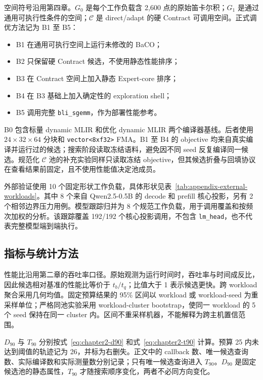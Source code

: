 空间符号沿用第四章。$G_0$ 是每个工作负载含 2,600 点的原始笛卡尔积；$G_1$ 是通过通用可执行性条件的空间；$\mathcal{C}$ 是 direct/adapt 的硬 Contract 可调用空间。正式调优方法记为 B1 至 B5：

\begin{itemize}
  \item B1 在通用可执行空间上运行未修改的 BaCO；
  \item B2 只保留硬 Contract 候选，不使用静态性能排序；
  \item B3 在 Contract 空间上加入静态 Expert-core 排序；
  \item B4 在 B3 基础上加入确定性的 exploration shell；
  \item B5 调用完整 \texttt{bli\_sgemm}，作为部署性能参考。
\end{itemize}

B0 包含标量 dynamic MLIR 和优化 dynamic MLIR 两个编译器基线。后者使用 $24\times32\times64$ 分块和 \texttt{vector<8xf32>} FMA。B1 至 B4 的 objective 均来自真实编译并运行过的候选；搜索阶段读取冻结语料，避免因不同 seed 反复编译同一候选。规范化 $\mathcal{C}$ 池的补充实验同样只读取冻结 objective，但其候选折叠与回填协议在查看结果前固定，且不使用性能值决定池成员。

外部验证使用 10 个固定形状工作负载，具体形状见表~\ref{tab:appendix-external-workloads}。其中 8 个来自 Qwen2.5-0.5B 的 decode 和 prefill 核心投影，另有 2 个相邻边界压力用例。模型跟踪归并为 8 个规范工作负载，用于调用覆盖和按频次加权的分析。该跟踪覆盖 192/192 个核心投影调用，不包含 \texttt{lm\_head}，也不代表完整模型端到端执行。

\subsection{指标与统计方法}

性能比沿用第二章的吞吐率口径。原始观测为运行时间时，吞吐率与时间成反比，因此候选相对基准的性能比等价于 $t_b/t_q$；比值大于 1 表示候选更快。跨 workload 聚合采用几何均值。固定预算结果的 95\% 区间以 workload 或 workload-seed 为重采样单位；严格同池实验采用 workload-cluster bootstrap，使同一 workload 的 5 个 seed 保持在同一 cluster 内。区间不重采样机器，不能解释为跨主机置信范围。

$D_{90}$ 与 $T_{90}$ 分别按式~\eqref{eq:chapter2-d90} 和式~\eqref{eq:chapter2-t90} 计算。预算 25 内未达到阈值的轨迹记为 26，并标为右删失。正文中的 callback 数、唯一候选查询数、实际编译数和实际测量数分别记录；只有唯一候选查询进入 $T_{90}$。$D_{90}$ 是固定候选池的静态属性，$T_{90}$ 才随搜索顺序变化，两者不必同方向变化。

